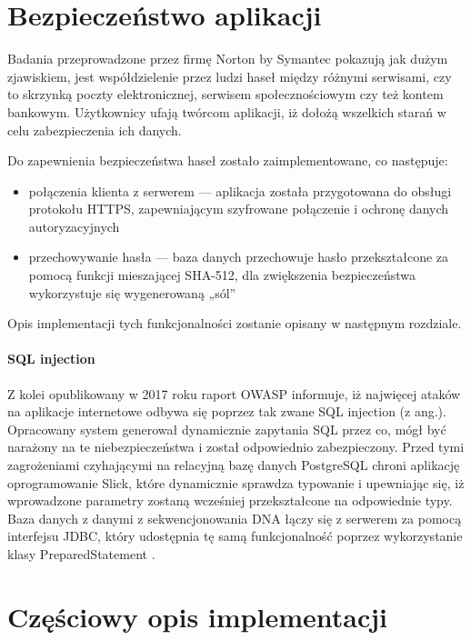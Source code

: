 \documentclass[a4paper,12pt,twoside]{article}
\begin{document}
\newpage
\section{Bezpieczeństwo aplikacji}
Badania przeprowadzone przez firmę Norton by Symantec \cite{nortonSec}
pokazują jak dużym zjawiskiem, jest współdzielenie przez ludzi haseł między różnymi serwisami, czy to
skrzynką poczty elektronicznej, serwisem społecznościowym czy też kontem bankowym.
Użytkownicy ufają twórcom aplikacji, iż dołożą wszelkich starań w celu zabezpieczenia ich
danych.

Do zapewnienia bezpieczeństwa haseł zostało zaimplementowane, co następuje:
\begin{itemize}
\item{połączenia klienta z serwerem} — aplikacja została przygotowana do obsługi protokołu HTTPS,
zapewniającym szyfrowane połączenie i ochronę danych autoryzacyjnych
\item{przechowywanie hasła — baza danych przechowuje hasło przekształcone za pomocą funkcji mieszającej SHA-512, dla zwiększenia bezpieczeństwa wykorzystuje się wygenerowaną „sól”
}
\end{itemize}

Opis implementacji tych funkcjonalności zostanie opisany w następnym rozdziale.

\paragraph{SQL injection} Z kolei opublikowany w 2017 roku raport OWASP \cite{owasp}
informuje, iż najwięcej ataków na aplikacje internetowe odbywa się poprzez tak zwane SQL injection (z ang.).
Opracowany system generował dynamicznie zapytania SQL przez co, mógł być narażony na te niebezpieczeństwa i został odpowiednio zabezpieczony.
Przed tymi zagrożeniami czyhającymi na relacyjną bazę danych PostgreSQL chroni aplikację oprogramowanie Slick, które dynamicznie sprawdza typowanie i upewniając się, iż wprowadzone parametry
zostaną wcześniej przekształcone na odpowiednie typy.
Baza danych z danymi z sekwencjonowania DNA łączy się z serwerem za pomocą interfejsu JDBC,
który udostępnia tę samą funkcjonalność poprzez wykorzystanie klasy PreparedStatement \cite{preparedStatement}.

\newpage

\section{Częściowy opis implementacji}
\end{document}
